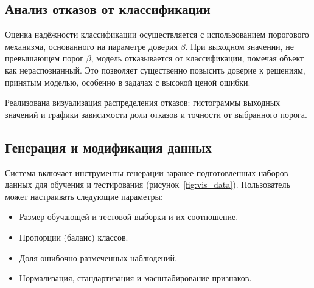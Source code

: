 \subsection{Анализ отказов от классификации}
Оценка надёжности классификации осуществляется с использованием порогового механизма, основанного на параметре доверия \(\beta\). При выходном значении, не превышающем порог \(\beta\), модель отказывается от классификации, помечая объект как нераспознанный. Это позволяет существенно повысить доверие к решениям, принятым моделью, особенно в задачах с высокой ценой ошибки.

Реализована визуализация распределения отказов: гистограммы выходных значений и графики зависимости доли отказов и точности от выбранного порога.

\subsection{Генерация и модификация данных}
Система включает инструменты генерации заранее подготовленных наборов данных для обучения и тестирования (рисунок~\cref{fig:vis_data}). Пользователь может настраивать следующие параметры:

\begin{itemize}
    \item Размер обучающей и тестовой выборки и их соотношение.
    \item Пропорции (баланс) классов.
    \item Доля ошибочно размеченных наблюдений.
    \item Нормализация, стандартизация и масштабирование признаков.
\end{itemize}

